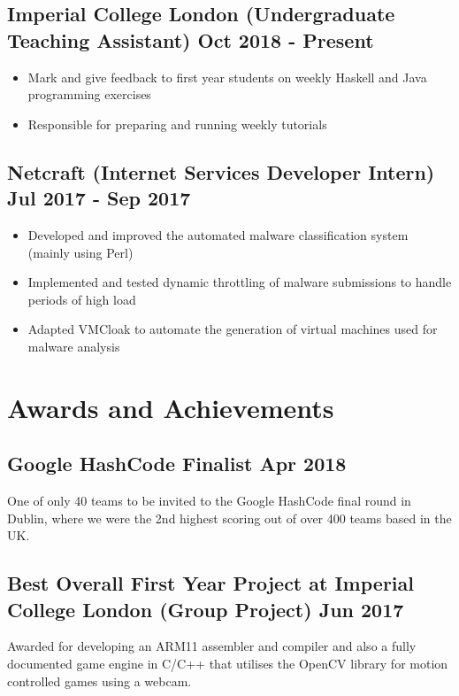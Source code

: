 \documentclass[a4paper]{article}
\begin{document}
\subsection*{Imperial College London \textnormal{(Undergraduate Teaching Assistant)} \hfill Oct 2018 - Present}

\begin{itemize}
    \item Mark and give feedback to first year students on weekly Haskell and Java programming exercises
    \item Responsible for preparing and running weekly tutorials
\end{itemize}

\subsection*{Netcraft \textnormal{(Internet Services Developer Intern)} \hfill Jul 2017 - Sep 2017}

\begin{itemize}
    \item Developed and improved the automated malware classification system (mainly using Perl)
    \item Implemented and tested dynamic throttling of malware submissions to handle periods of high load
    \item Adapted VMCloak to automate the generation of virtual machines used for malware analysis
\end{itemize}

\section*{Awards and Achievements}

\subsection*{Google HashCode Finalist \hfill Apr 2018}

One of only 40 teams to be invited to the Google HashCode final round in Dublin, where we were the 2nd highest scoring out of over 400 teams based in the UK.

\subsection*{Best Overall First Year Project at Imperial College London \textnormal{(Group Project)} \hfill Jun 2017}

Awarded for developing an ARM11 assembler and compiler and also a fully documented game engine in C/C++ that utilises the OpenCV library for motion controlled games using a webcam.
\end{document}
